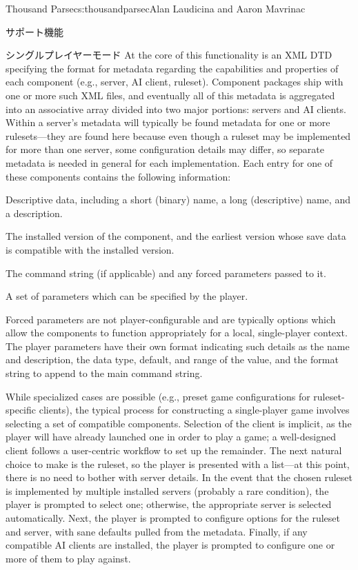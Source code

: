 \begin{aosachapter}{Thousand Parsec}{s:thousandparsec}{Alan Laudicina and Aaron Mavrinac}
\begin{aosasect1}{サポート機能}
\begin{aosasect2}{シングルプレイヤーモード}
At the core of this functionality is an XML DTD specifying the format
for metadata regarding the capabilities and properties of each
component (e.g., server, AI client, ruleset). Component packages ship
with one or more such XML files, and eventually all of this metadata
is aggregated into an associative array divided into two major
portions: servers and AI clients. Within a server's metadata will
typically be found metadata for one or more rulesets---they are found
here because even though a ruleset may be implemented for more than
one server, some configuration details may differ, so
separate metadata is needed in general for each implementation.
Each entry for one of these components contains the following information:

\begin{aosaitemize}

  \item Descriptive data, including a short (binary) name, a long
  (descriptive) name, and a description.

  \item The installed version of the component, and the earliest
  version whose save data is compatible with the installed version.

  \item The command string (if applicable) and any forced parameters
  passed to it.

  \item A set of parameters which can be specified by the player.

\end{aosaitemize}

Forced parameters are not player-configurable and are typically
options which allow the components to function appropriately for a
local, single-player context. The player parameters have their own
format indicating such details as the name and description, the data
type, default, and range of the value, and the format string to append
to the main command string.

While specialized cases are possible (e.g., preset game configurations
for ruleset-specific clients), the typical process for constructing a
single-player game involves selecting a set of compatible
components. Selection of the client is implicit, as the player will
have already launched one in order to play a game; a well-designed
client follows a user-centric workflow to set up the remainder. The
next natural choice to make is the ruleset, so the player is presented
with a list---at this point, there is no need to bother with server
details. In the event that the chosen ruleset is implemented by
multiple installed servers (probably a rare condition), the player is
prompted to select one; otherwise, the appropriate server is selected
automatically. Next, the player is prompted to configure options for
the ruleset and server, with sane defaults pulled from the
metadata. Finally, if any compatible AI clients are installed, the
player is prompted to configure one or more of them to play against.


\end{aosasect2}
\end{aosasect1}
\end{aosachapter}
